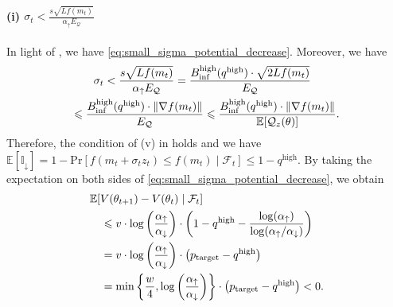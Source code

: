 \documentclass[journal]{IEEEtran}
\providecommand{\E}{\mathbb{E}} %
\renewcommand{\leq}{\leqslant} %
\DeclarePairedDelimiter{\norm}{\lVert}{\rVert}
\theoremstyle{definition}
\newcommand{\inddown}{\mathbb{I}_{\downarrow}}
\newcommand{\aup}{\alpha_{\uparrow}}
\newcommand{\adown}{\alpha_{\downarrow}}
\begin{document}
\paragraph*{(i) $\sigma_t < \frac{s\sqrt{L f(m_t)}}{\aup E_\mathcal{Q}}$}
In light of , we have \eqref{eq:small_sigma_potential_decrease}.
Moreover, we have
\begin{multline}
\hspace{-0.8em}
\sigma_t < \frac{s\sqrt{L f(m_t)}}{\aup E_\mathcal{Q}}
= \frac{B_{\inf}^\mathrm{high}(q^\mathrm{high}) \cdot \sqrt{2 L f(m_t)}}{E_\mathcal{Q}}
\\
\leq \frac{B_{\inf}^\mathrm{high}(q^\mathrm{high}) \cdot \norm{\nabla f(m_t)}}{E_\mathcal{Q}}
\leq \frac{B_{\inf}^\mathrm{high}(q^\mathrm{high}) \cdot \norm{\nabla f(m_t)}}{\E[\mathcal{Q}_z(\theta)]}.
\end{multline}
Therefore, the condition of (v) in  holds and we have
$\E[\inddown] = 1 - \mathrm{Pr}\left[f(m_t + \sigma_t z_t)\leq f(m_t) \mid \mathcal{F}_t\right] \leq 1 - q^\mathrm{high}$.
By taking the expectation on both sides of \eqref{eq:small_sigma_potential_decrease}, we obtain
\begin{equation}
\begin{split}
\MoveEqLeft[1]\E[ V(\theta_{t+1}) - V(\theta_t) \mid \mathcal{F}_t ]
\\
&\leq
v\cdot \log\left(\frac{\aup}{\adown}\right)\cdot \left( 1 - q^\text{high} - \frac{\log(\aup)}{\log(\aup / \adown)} \right)
\\
&=
v\cdot \log\left(\frac{\aup}{\adown}\right)\cdot \left( p_\mathrm{target} - q^\text{high}\right)
\\
&=
\min\left\{ \frac{w}{4} , \log\left(\frac{\aup}{\adown}\right)\right\}
\cdot \left( p_\mathrm{target} - q^\text{high}\right)
<0
\label{eq:small_expected_potential_decrease}
.
\end{split}
\end{equation}
\end{document}
